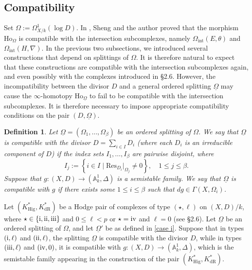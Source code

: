 \documentclass[12pt, a4paper]{article}
\newtheorem{definition}{Definition}[section]
\begin{document}
\subsection{Compatibility}
Set $\Omega := \Omega^1_{X/k}(\log D)$. In \cite{SZ2}, Sheng and the author proved that the morphism $\mathrm{Ho}_\Omega$ is compatible with the intersection subcomplexes, namely $\Omega_{\mathrm{int}}(E, \theta)$ and $\Omega_{\mathrm{int}}(H, \nabla)$. In the previous two subsections, we introduced several constructions that depend on splittings of \( \Omega \). It is therefore natural to expect that these constructions are compatible with the intersection subcomplexes again, and even possibly with the complexes introduced in \S2.6.
 However, the incompatibility between the divisor $D$ and a general ordered splitting $\underline{\Omega}$ may cause the $\infty$-homotopy $\mathrm{Ho}_{\underline{\Omega}}$ to fail to be compatible with the intersection subcomplexes. It is therefore necessary to impose appropriate compatibility conditions on the pair $(D, \underline{\Omega})$.

\begin{definition}
Let $\underline{\Omega} = (\Omega_1, \ldots, \Omega_\beta)$ be an ordered splitting of $\Omega$. We say that $\underline{\Omega}$ is compatible with the divisor $D = \sum_{i \in I} D_i$ (where each $D_i$ is an irreducible component of $D$) if the index sets $I_1, \ldots, I_\beta$ are pairwise disjoint, where
\[
I_j := \left\{ i \in I \mid \mathrm{Res}_{D_i}|_{\Omega_j} \neq 0 \right\}, \quad 1 \leq j \leq \beta.
\]
Suppose that $g:(X,D)\to(\mathbb A_k^1,\Delta)$ is a semistable family. We say that $\underline{\Omega}$ is compatible with $g$ if there exists some $1 \leq i \leq \beta$ such that
$dg \in \Gamma(X, \Omega_i)$.

\end{definition}
Let $(K^*_\mathrm{Hig},K^*_\mathrm{dR})$ be a Hodge pair of complexes of type $(\star,\ell)$ on $(X,D)/k$, where $\star\in\{\mathrm{\uppercase\expandafter{\romannumeral1}}, \mathrm{\uppercase\expandafter{\romannumeral2}} 
 ,\mathrm{\uppercase\expandafter{\romannumeral3}}\}
$ and $0\leq \ell<p$ or $\star=\mathrm{\uppercase\expandafter{\romannumeral4}}$ and $\ell=0$ (see \S2.6).
Let $\underline{\Omega}$ be an ordered splitting of $\Omega$, and let $\underline{\Omega}'$ be as defined in \eqref{case i}. Suppose that in types $(\mathrm{\uppercase\expandafter{\romannumeral1}},\ell)$ and $(\mathrm{\uppercase\expandafter{\romannumeral2}},\ell)$, the splitting $\underline{\Omega}$ is compatible with the divisor $D$, while in types $(\mathrm{\uppercase\expandafter{\romannumeral3}},\ell)$ and $(\mathrm{\uppercase\expandafter{\romannumeral4}},0)$, it is compatible with $g:(X,D)\to(\mathbb A^1_k,\Delta)$, which is the semistable family appearing in the construction of the pair $(K^*_{\mathrm{Hig}},K^*_{\mathrm{dR}})$. 
\end{document}
